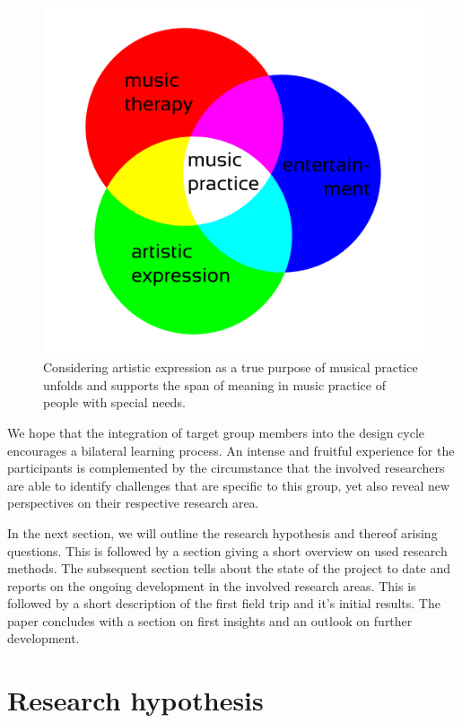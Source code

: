 \documentclass{chi-ext}
\begin{document}
\begin{multicols}{2}
\begin{figure}
	\includegraphics[width=\columnwidth]{media/musicThreefold-2.pdf}
	\caption{Considering artistic expression as a true purpose of musical practice unfolds and supports the span of meaning in music practice of people with special needs.}
	\label{fig:media_musicThreefold}
\end{figure}

We hope that the integration of target group members into the design cycle encourages a bilateral learning process.
An intense and fruitful experience for the participants is complemented by the circumstance that the involved researchers are able to identify challenges that are specific to this group, yet also reveal new perspectives on their respective research area.

In the next section, we will outline the research hypothesis and thereof arising questions. 
This is followed by a section giving a short overview on used research methods. 
The subsequent section tells about the state of the project to date and reports on the ongoing development in the involved research areas.
This is followed by a short description of the first field trip and it's initial results.
The paper concludes with a section on first insights and an outlook on further development.

\section{Research hypothesis}
\label{sec:research_objectives}


\end{multicols}
\end{document}
